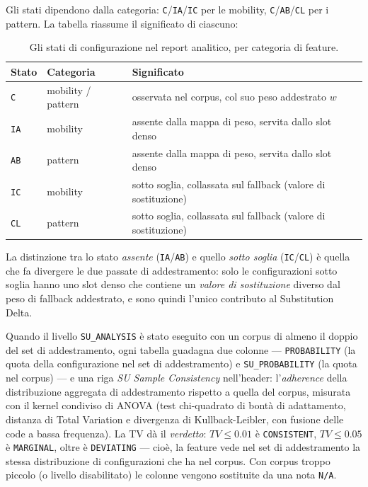 Gli stati dipendono dalla categoria: \texttt{C}/\texttt{IA}/\texttt{IC} per
le mobility, \texttt{C}/\texttt{AB}/\texttt{CL} per i pattern. La tabella
riassume il significato di ciascuno:

\begin{table}[htbp]
\centering
\small
\begin{tabular}{lll}
\toprule
Stato & Categoria & Significato \\
\midrule
\texttt{C}  & mobility / pattern & osservata nel corpus, col suo peso addestrato $w$ \\
\texttt{IA} & mobility & assente dalla mappa di peso, servita dallo slot denso \\
\texttt{AB} & pattern  & assente dalla mappa di peso, servita dallo slot denso \\
\texttt{IC} & mobility & sotto soglia, collassata sul fallback (valore di sostituzione) \\
\texttt{CL} & pattern  & sotto soglia, collassata sul fallback (valore di sostituzione) \\
\bottomrule
\end{tabular}
\caption{Gli stati di configurazione nel report analitico, per categoria di
feature.}
\label{tab:conf-status}
\end{table}

La distinzione tra lo stato \emph{assente} (\texttt{IA}/\texttt{AB}) e quello
\emph{sotto soglia} (\texttt{IC}/\texttt{CL}) è quella che fa divergere le
due passate di addestramento: solo le configurazioni sotto soglia hanno uno
slot denso che contiene un \emph{valore di sostituzione} diverso dal peso di
fallback addestrato, e sono quindi l'unico contributo al Substitution Delta.

Quando il livello \texttt{SU\_ANALYSIS} è stato eseguito con un corpus di
almeno il doppio del set di addestramento, ogni tabella guadagna due
colonne — \texttt{PROBABILITY} (la quota della configurazione nel set di
addestramento) e \texttt{SU\_PROBABILITY} (la quota nel corpus) — e una riga
\emph{SU Sample Consistency} nell'header: l'\emph{adherence} della
distribuzione aggregata di addestramento rispetto a quella del corpus,
misurata con il kernel condiviso di ANOVA (test chi-quadrato di bontà di
adattamento, distanza di Total Variation e divergenza di Kullback-Leibler,
con fusione delle code a bassa frequenza). La TV dà il \emph{verdetto}:
$TV \le 0.01$ è \texttt{CONSISTENT}, $TV \le 0.05$ è \texttt{MARGINAL},
oltre è \texttt{DEVIATING} — cioè, la feature vede nel set di addestramento
la stessa distribuzione di configurazioni che ha nel corpus. Con corpus
troppo piccolo (o livello disabilitato) le colonne vengono sostituite da
una nota \texttt{N/A}.

